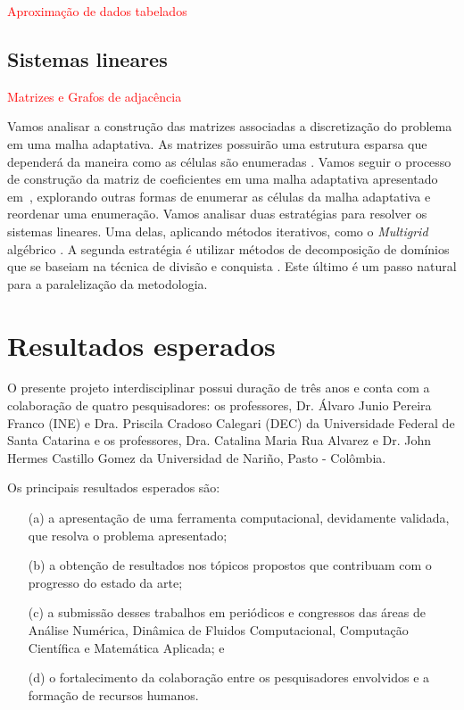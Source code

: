 \documentclass[12pt]{article}
\begin{document}
\textcolor{red}{Aproximação de dados tabelados}

\subsection{Sistemas lineares}

\textcolor{red}{Matrizes e Grafos de adjacência}

Vamos analisar a construção das matrizes associadas a discretização do problema em uma malha adaptativa. As matrizes possuirão uma estrutura esparsa que dependerá da maneira como as células são enumeradas \cite{SAA03}. Vamos seguir o processo de construção  da matriz de coeficientes em uma malha adaptativa apresentado em~\cite{ALV13}, explorando outras formas de enumerar as células da malha adaptativa e reordenar uma enumeração. Vamos analisar duas estratégias para resolver os sistemas lineares. Uma delas, aplicando métodos iterativos, como o {\it Multigrid} algébrico \cite{TRO01}. A segunda estratégia é utilizar métodos de decomposição de domínios que se baseiam na técnica de divisão e conquista \cite{SAA03}. Este último é um passo natural para a paralelização da metodologia.

\section{Resultados esperados}\label{ss.conclusao}

O presente projeto interdisciplinar possui duração de três anos e conta com a colaboração de quatro pesquisadores: os professores, Dr. Álvaro Junio Pereira Franco (INE) e Dra. Priscila Cradoso Calegari (DEC) da Universidade Federal de Santa Catarina e os professores, Dra. Catalina Maria Rua Alvarez e Dr. John Hermes Castillo Gomez da Universidad de Nari\~no, Pasto - Colômbia.  

Os principais resultados esperados são:
\begin{enumerate}
  \vspace{-1pc}
\item [(a)] a apresentação de uma ferramenta computacional, devidamente validada, que resolva o problema apresentado;
  \vspace{-0.5pc}
  \item [(b)] a obtenção de resultados nos tópicos propostos que contribuam com o progresso do estado da arte; 
  \vspace{-0.5pc}
\item [(c)] a submissão desses trabalhos em periódicos e congressos das áreas de Análise Numérica, Dinâmica de Fluidos Computacional, Computação Científica e Matemática Aplicada; e 
  \vspace{-0.5pc}
  \item [(d)] o fortalecimento da colaboração entre os pesquisadores envolvidos e a formação de recursos humanos.
  \end{enumerate}
\end{document}
